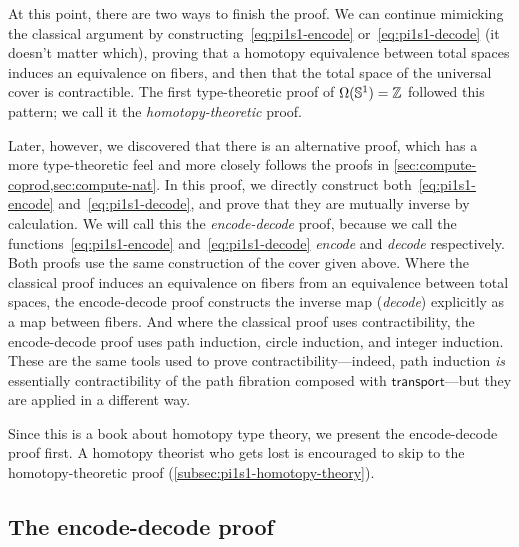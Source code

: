 At this point, there are two ways to finish the proof.
We can continue mimicking the classical argument by constructing~\eqref{eq:pi1s1-encode} or~\eqref{eq:pi1s1-decode} (it doesn't matter which), proving that a homotopy equivalence between total spaces induces an equivalence on fibers, and then that the total space of the universal cover is contractible.
The first type-theoretic proof of $\Omega(\mathbb{S}^1)=\mathbb{Z}$ followed this pattern; we call it the \emph{homotopy-theoretic} proof.

Later, however, we discovered that there is an alternative proof, which has a more type-theoretic feel and more closely follows the proofs in \cref{sec:compute-coprod,sec:compute-nat}.
In this proof, we directly construct both~\eqref{eq:pi1s1-encode} and~\eqref{eq:pi1s1-decode}, and prove that they are mutually inverse by calculation.
We will call this the \emph{encode-decode} proof, because we call the functions~\eqref{eq:pi1s1-encode} and~\eqref{eq:pi1s1-decode} \emph{encode} and \emph{decode} respectively.
Both proofs use the same construction of the cover given above.
Where the classical proof induces an equivalence on fibers from an equivalence between total spaces, the encode-decode proof constructs the inverse map (\emph{decode}) explicitly as a map between fibers.
And where the classical proof uses contractibility, the encode-decode proof uses path induction, circle induction, and integer induction.
These are the same tools used to prove contractibility---indeed, path induction \emph{is} essentially contractibility of the path fibration composed with $\mathsf{transport}$---but they are applied in a different way.

Since this is a book about homotopy type theory, we present the encode-decode proof first.
A homotopy theorist who gets lost is encouraged to skip to the homotopy-theoretic proof (\cref{subsec:pi1s1-homotopy-theory}).

%
%
%

\subsection{The encode-decode proof}
\label{subsec:pi1s1-encode-decode}


